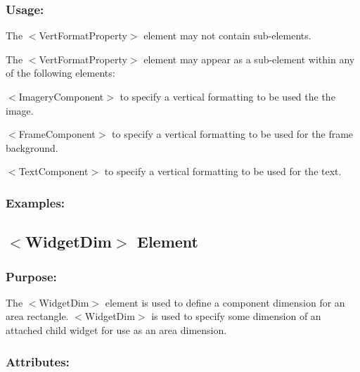 \hypertarget{fal_element_ref_fal_elem_ref_sec_37_3}{}\subsubsection{Usage\+:}\label{fal_element_ref_fal_elem_ref_sec_37_3}

\begin{DoxyItemize}
\item The {\ttfamily $<$Vert\+Format\+Property$>$} element may not contain sub-\/elements.


\item The {\ttfamily $<$Vert\+Format\+Property$>$} element may appear as a sub-\/element within any of the following elements\+: 
\begin{DoxyItemize}
\item {\ttfamily $<$Imagery\+Component$>$} to specify a vertical formatting to be used the the image. 
\item {\ttfamily $<$Frame\+Component$>$} to specify a vertical formatting to be used for the frame background. 
\item {\ttfamily $<$Text\+Component$>$} to specify a vertical formatting to be used for the text. 
\end{DoxyItemize}
\end{DoxyItemize}\hypertarget{fal_element_ref_fal_elem_ref_sec_37_4}{}\subsubsection{Examples\+:}\label{fal_element_ref_fal_elem_ref_sec_37_4}
\hypertarget{fal_element_ref_fal_elem_ref_sec_38}{}\subsection{$<$\+Widget\+Dim$>$ Element}\label{fal_element_ref_fal_elem_ref_sec_38}
\hypertarget{fal_element_ref_fal_elem_ref_sec_38_1}{}\subsubsection{Purpose\+:}\label{fal_element_ref_fal_elem_ref_sec_38_1}
The {\ttfamily $<$Widget\+Dim$>$} element is used to define a component dimension for an area rectangle. {\ttfamily $<$Widget\+Dim$>$} is used to specify some dimension of an attached child widget for use as an area dimension.\hypertarget{fal_element_ref_fal_elem_ref_sec_38_2}{}\subsubsection{Attributes\+:}\label{fal_element_ref_fal_elem_ref_sec_38_2}
